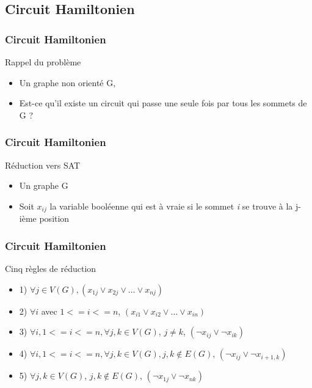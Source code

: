 

\subsection{Circuit Hamiltonien}

\begin{frame}
\frametitle{Circuit Hamiltonien}
\begin{block}{Rappel du probl\`eme}
  \begin{itemize}
  \item Un graphe non orient\'e G,
  \item Est-ce qu'il existe un circuit qui passe une seule fois par
    tous les sommets de G ?
  \end{itemize}
\end{block}
\end{frame}

\begin{frame}
\frametitle{Circuit Hamiltonien}
\begin{block}{R\'eduction vers SAT}
  \begin{itemize}
  \item Un graphe G
  \item Soit \textit{$x_{ij}$} la variable bool\'eenne qui est \`a
    vraie si le sommet \textit{i} se trouve \`a la j-i\`eme position
  \end{itemize}
\end{block}
\end{frame}

\begin{frame}
\frametitle{Circuit Hamiltonien}
\begin{block}{Cinq r\`egles de r\'eduction}
  \begin{itemize}
  \item 1) $\forall j \in V(G), (x_{1j} \vee x_{2j} \vee \ldots \vee
    x_{nj})$
  \item 2) $\forall i$ avec $1 <= i <= n$, $(x_{i1} \vee x_{i2} \vee
    \ldots \vee x_{in})$
  \item 3) $\forall i, 1 <= i <= n, \forall {j, k} \in V(G)$, $j \ne
    k$, $(\neg x_{ij} \vee \neg x_{ik})$
  \item 4) $\forall i, 1 <= i <= n, \forall {j, k} \in V(G), j,k
    \notin E(G)$, $(\neg x_{ij} \vee \neg x_{i+1,k})$
  \item 5) $\forall j,k \in V(G)$, ${j,k} \notin E(G)$, $(\neg x_{1j}
    \vee \neg x_{nk})$
  \end{itemize}
\end{block}
\end{frame}

